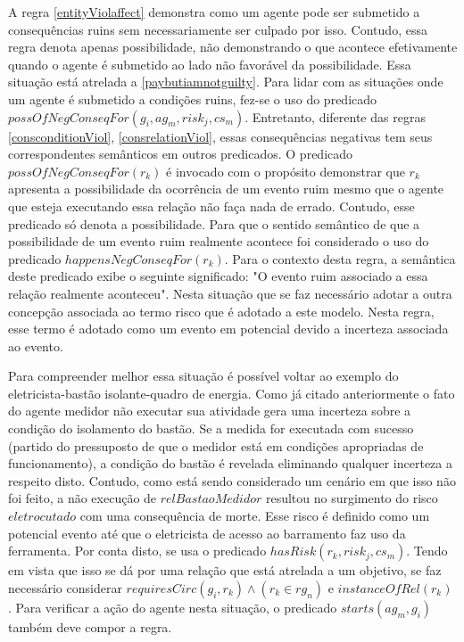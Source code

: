 A regra \ref{entityViolaffect} demonstra como um agente pode ser submetido a consequências ruins sem necessariamente ser culpado por isso. Contudo, essa regra denota apenas possibilidade, não demonstrando o que acontece efetivamente quando o agente é submetido ao lado não favorável da possibilidade. Essa situação está atrelada a \ref{paybutiamnotguilty}. Para lidar com as situações onde um agente é submetido a condições ruins, fez-se o uso do predicado $possOfNegConseqFor(g_i,ag_m,risk_j,cs_m) $. Entretanto, diferente das regras \ref{consconditionViol}, \ref{consrelationViol}, essas consequências negativas tem seus correspondentes semânticos em outros predicados. O predicado $possOfNegConseqFor(r_k)$ é invocado com o propósito demonstrar que $r_k$ apresenta a possibilidade da ocorrência de um evento ruim mesmo que o agente que esteja executando essa relação não faça nada de errado. Contudo, esse predicado só denota a possibilidade. Para que o sentido semântico de que a possibilidade de um evento ruim realmente acontece foi considerado o uso do predicado $happensNegConseqFor(r_k)$. Para o contexto desta regra, a semântica deste predicado exibe o seguinte significado: "O evento ruim associado a essa relação realmente aconteceu". Nesta situação que se faz necessário adotar a outra concepção associada ao termo risco que é adotado a este modelo. Nesta regra, esse termo é adotado como um evento em potencial devido a incerteza associada ao evento. 

Para compreender melhor essa situação é possível voltar ao exemplo do eletricista-bastão isolante-quadro de energia. Como já citado anteriormente o fato do agente medidor não executar sua atividade gera uma incerteza sobre a condição do isolamento do bastão. Se a medida for executada com sucesso (partido do pressuposto de que o medidor está em condições apropriadas de funcionamento), a condição do bastão é revelada eliminando qualquer incerteza a respeito disto. Contudo, como está sendo considerado um cenário em que isso não foi feito, a não execução de $relBastaoMedidor$ resultou no surgimento do risco $eletrocutado$ com uma consequência de morte. Esse risco é definido como um potencial evento até que o eletricista de acesso ao barramento faz uso da ferramenta. Por conta disto, se usa o predicado $hasRisk(r_k,risk_j,cs_m)$. Tendo em vista que isso se dá por uma relação que está atrelada a um objetivo, se faz necessário considerar $requiresCirc(g_i,r_k) \wedge (r_k \in rg_n) $ e  $instanceOfRel(r_k)$ . Para verificar a ação do agente nesta situação, o predicado $starts(ag_m,g_i)$ também deve compor a regra.


